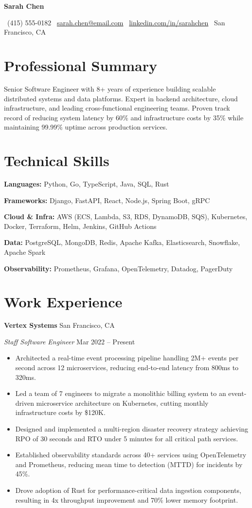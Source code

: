 \documentclass[11pt,letterpaper]{article}
\newcommand{\cvheader}[1]{%
  \begin{center}
    {\Huge\bfseries\color{PriBlue} #1}
    \vspace{4pt}
  \end{center}
}
\newcommand{\cvcontact}[4]{%
  \begin{center}
    \small
    \faPhone\ #1 \quad
    \faEnvelope\ \href{mailto:#2}{#2} \quad
    \faLinkedin\ \href{https://linkedin.com/in/#3}{linkedin.com/in/#3} \quad
    \faMapMarker*\ #4
  \end{center}
}
\newcommand{\cvtitleentry}[4]{%
  \noindent
  {\bfseries #1} \hfill {\small\color{GrayRule} #2}\par
  \noindent
  {\itshape\color{PriBlue} #3} \hfill {\small\color{GrayRule} #4}\par
}
\newcommand{\cvskillgroup}[2]{%
  \noindent
  {\bfseries #1:} #2
}
\begin{document}
\cvheader{Sarah Chen}

\cvcontact{(415) 555-0182}{sarah.chen@email.com}{sarahchen}{San Francisco, CA}

\vspace{6pt}

\section{Professional Summary}

Senior Software Engineer with 8+ years of experience building scalable distributed systems and data platforms. Expert in backend architecture, cloud infrastructure, and leading cross-functional engineering teams. Proven track record of reducing system latency by 60\% and infrastructure costs by 35\% while maintaining 99.99\% uptime across production services.

\section{Technical Skills}

\cvskillgroup{Languages}{Python, Go, TypeScript, Java, SQL, Rust}
\vspace{2pt}
\cvskillgroup{Frameworks}{Django, FastAPI, React, Node.js, Spring Boot, gRPC}
\vspace{2pt}
\cvskillgroup{Cloud \& Infra}{AWS (ECS, Lambda, S3, RDS, DynamoDB, SQS), Kubernetes, Docker, Terraform, Helm, Jenkins, GitHub Actions}
\vspace{2pt}
\cvskillgroup{Data}{PostgreSQL, MongoDB, Redis, Apache Kafka, Elasticsearch, Snowflake, Apache Spark}
\vspace{2pt}
\cvskillgroup{Observability}{Prometheus, Grafana, OpenTelemetry, Datadog, PagerDuty}

\section{Work Experience}

\cvtitleentry{Vertex Systems}{San Francisco, CA}{Staff Software Engineer}{Mar 2022 -- Present}

\begin{itemize}
  \item Architected a real-time event processing pipeline handling 2M+ events per second across 12 microservices, reducing end-to-end latency from 800ms to 320ms.
  \item Led a team of 7 engineers to migrate a monolithic billing system to an event-driven microservice architecture on Kubernetes, cutting monthly infrastructure costs by \$120K.
  \item Designed and implemented a multi-region disaster recovery strategy achieving RPO of 30 seconds and RTO under 5 minutes for all critical path services.
  \item Established observability standards across 40+ services using OpenTelemetry and Prometheus, reducing mean time to detection (MTTD) for incidents by 45\%.
  \item Drove adoption of Rust for performance-critical data ingestion components, resulting in 4x throughput improvement and 70\% lower memory footprint.
\end{itemize}
\end{document}
